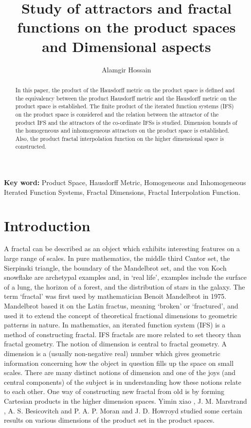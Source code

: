 \documentclass[10pt]{amsart}
\title{Study of attractors and fractal functions on the product spaces and Dimensional aspects}
\author{Alamgir Hossain}
\theoremstyle{definition}
\begin{document}
	\pagestyle{plain}	
	\maketitle	
	
	\begin{abstract}
		In this paper, the product of the Hausdorff metric on the product space is defined and the equivalency between the product Hausdorff metric and the Hausdorff metric on the product space is established. The finite product of the iterated function systems (IFS) on the product space is considered and the relation between the attractor of the product IFS and the attractors of the co-ordinate IFSs is studied. Dimension bounds of the  homogeneous and inhomogeneous attractors on the product space is established. Also, the product fractal interpolation function on the higher dimensional space is constructed.
	\end{abstract}
	\textbf{Key word:} Product Space, Hausdorff Metric, Homogeneous and Inhomogeneous Iterated Function Systems, Fractal Dimensions, Fractal Interpolation Function.\\
	\section{Introduction}
	A fractal can be described as an object which exhibits interesting features on a large range of scales. In pure mathematics,  the middle third Cantor set, the Sierpinski triangle, the boundary of the Mandelbrot set, and the von Koch snowflake are archetypal examples and, in `real life', examples include the surface of a lung, the horizon of a forest, and the distribution of stars in the galaxy. The term `fractal' was first used by mathematician Benoit Mandelbrot \cite{FGN} in 1975. Mandelbrot based it on the Latin fractus, meaning `broken' or `fractured', and used it to extend the concept of theoretical fractional dimensions to geometric patterns in nature. In mathematics, an iterated function system (IFS) is a method of constructing fractal. IFS fractals are more related to set theory than fractal geometry. The notion of dimension is central to fractal geometry. A dimension is a (usually non-negative real) number which gives geometric information concerning how the object in question fills up the space on small scales. There are many distinct notions of dimension and one of the joys (and central components) of the subject is in understanding how these notions relate to each other.  One way of constructing new fractal from old is by forming Cartesian products in the higher dimension spaces. Yimin xiao \cite{hpdoncp}, J. M. Marstrand \cite{tdocpset}, A. S. Besicovitch and P. A. P. Moran \cite{dotsset} and J. D. Howroyd \cite{PD} studied some certain results on various dimensions of the product set in the product spaces.   \\
	
\end{document}
